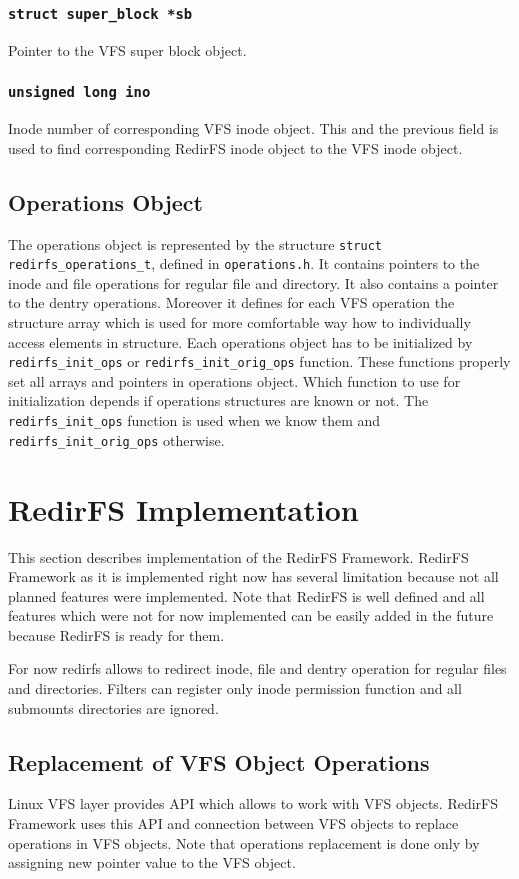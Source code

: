 \subsubsection{\texttt{struct super\_block *sb}}
Pointer to the VFS super block object.

\subsubsection{\texttt{unsigned long ino}}
Inode number of corresponding VFS inode object. This and the previous field is used to
find corresponding RedirFS inode object to the VFS inode object.

\subsection{Operations Object}
The operations object is represented by the structure \texttt{struct redirfs\_operations\_t},
defined in \texttt{operations.h}. It contains pointers to the inode and file
operations for regular file and directory. It also contains a pointer to the dentry
operations. Moreover it defines for each VFS operation the structure array
which is used for more comfortable way how to individually access elements in
structure. Each operations object has to be initialized by \texttt{redirfs\_init\_ops}
or \texttt{redirfs\_init\_orig\_ops} function. These functions properly set all arrays
and pointers in operations object. Which function to use for initialization depends if
operations structures are known or not. The \texttt{redirfs\_init\_ops} function is
used when we know them and \texttt{redirfs\_init\_orig\_ops} otherwise.

\section{RedirFS Implementation}
This section describes implementation of the RedirFS Framework. RedirFS Framework as
it is implemented right now has several limitation because not all planned features
were implemented. Note that RedirFS is well defined and all features which were not
for now implemented can be easily added in the future because RedirFS is ready for
them.

For now redirfs allows to redirect inode, file and dentry operation for regular files
and directories. Filters can register only inode permission function and all submounts
directories are ignored.

\subsection{Replacement of VFS Object Operations}
Linux VFS layer provides API which allows to work with VFS objects. RedirFS Framework
uses this API and connection between VFS objects to replace operations in VFS objects.
Note that operations replacement is done only by assigning new pointer value to the
VFS object.

